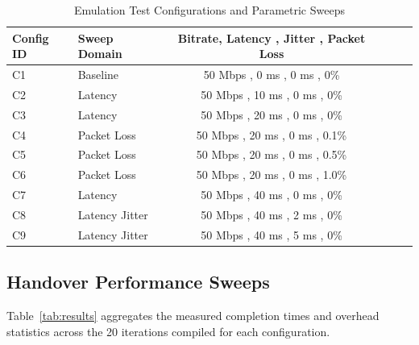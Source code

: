 \documentclass[conference]{IEEEtran}
\begin{document}
\begin{table}[t]
\caption{Emulation Test Configurations and Parametric Sweeps}
\centering
\begin{tabular}{llcccc}
\toprule
\textbf{Config ID} & \textbf{Sweep Domain} & \textbf{Bitrate}, \textbf{Latency} , \textbf{Jitter} , \textbf{Packet Loss} \\
\midrule
C1 &  Baseline & 50 Mbps , 0 ms , 0 ms , 0\% \\
C2 & Latency  & 50 Mbps , 10 ms , 0 ms , 0\% \\
C3 & Latency  & 50 Mbps , 20 ms , 0 ms , 0\% \\
C4 & Packet Loss  & 50 Mbps , 20 ms , 0 ms , 0.1\% \\
C5 & Packet Loss  & 50 Mbps , 20 ms , 0 ms , 0.5\% \\
C6 & Packet Loss  & 50 Mbps , 20 ms , 0 ms , 1.0\% \\
C7 & Latency  & 50 Mbps , 40 ms , 0 ms , 0\% \\
C8 & Latency Jitter  & 50 Mbps , 40 ms , 2 ms , 0\% \\
C9 & Latency Jitter  & 50 Mbps , 40 ms , 5 ms , 0\% \\
\bottomrule
\end{tabular}
\label{tab:setup}
\end{table}

\subsection{Handover Performance Sweeps}
Table~\ref{tab:results} aggregates the measured completion times and overhead statistics across the 20 iterations compiled for each configuration.

\end{document}
